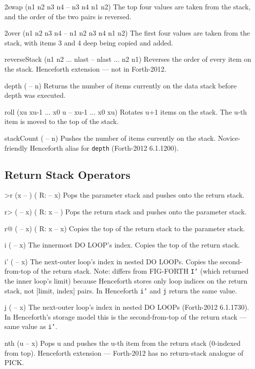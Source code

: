 \documentclass[a4paper, 11pt, openany]{book}
\begin{document}
\begin{forthbox}
  2swap         (n1 n2 n3 n4 -- n3 n4 n1 n2)
                The top four values are taken from the stack, and
                the order of the two pairs is reversed.

  2over         (n1 n2 n3 n4 -- n1 n2 n3 n4 n1 n2)
                The first four values are taken from the stack,
                with items 3 and 4 deep being copied and added.

  reverseStack  (n1 n2 ... nlast -- nlast ... n2 n1)
                Reverses the order of every item on the stack.
                Henceforth extension --- not in Forth-2012.

  depth         ( -- n)
                Returns the number of items currently on the data
                stack before depth was executed.

  roll          (xu xu-1 ... x0 u -- xu-1 ... x0 xu)
                Rotates u+1 items on the stack. The u-th item is
                moved to the top of the stack.

  stackCount    ( -- n)
                Pushes the number of items currently on the stack.
                Novice-friendly Henceforth alias for \texttt{depth}
                (Forth-2012 6.1.1200).
\end{forthbox}

\subsection{Return Stack Operators}

\begin{forthbox}
  >r   (x -- )  ( R: -- x)
       Pops the parameter stack and pushes onto the return stack.

  r>   ( -- x)  ( R: x -- )
       Pops the return stack and pushes onto the parameter stack.

  r@   ( -- x)  ( R: x -- x)
       Copies the top of the return stack to the parameter stack.

  i    ( -- x)
       The innermost DO LOOP's index. Copies the top of the return
       stack.

  i'   ( -- x)
       The next-outer loop's index in nested DO LOOPs. Copies the
       second-from-top of the return stack. Note: differs from
       FIG-FORTH \texttt{I'} (which returned the inner loop's
       limit) because Henceforth stores only loop indices on the
       return stack, not [limit, index] pairs. In Henceforth
       \texttt{i'} and \texttt{j} return the same value.

  j    ( -- x)
       The next-outer loop's index in nested DO LOOPs (Forth-2012
       6.1.1730). In Henceforth's storage model this is the
       second-from-top of the return stack --- same value as
       \texttt{i'}.

  nth  (u -- x)
       Pops u and pushes the u-th item from the return stack
       (0-indexed from top). Henceforth extension --- Forth-2012
       has no return-stack analogue of PICK.
\end{forthbox}
\end{document}
